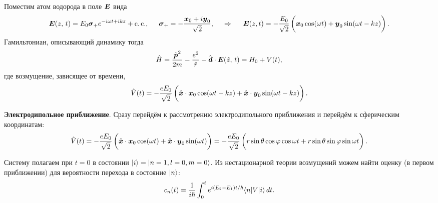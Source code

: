 Поместим атом водорода в поле $\mbox{\boldmath $E$}$ вида
\begin{equation*}
    \vc{E} (z,\, t) = E_0 \vc{\sigma}_+ e^{-i \omega t + i k z} + \cc, 
    \hspace{5 mm} 
    \vc{\sigma}_+ = - \frac{\vc{x}_0 + i \vc{y}_0}{\sqrt{2}},
    \hspace{0.5cm} \Rightarrow \hspace{0.5cm}   
    \vc{E} (z, t) = - \frac{{E}_0}{\sqrt{2}} \left(
        \vp
        \vc{x}_0 \cos(\omega t) + \vc{y}_0 \sin(\omega t - k z)
    \right).
\end{equation*}
Гамильтониан, описывающий динамику тогда
\begin{equation*}
    \hat{H} = \frac{\hat{\mbox{\boldmath $p$}}^2}{2 m} - \frac{e^2}{\hat{r}} - \hat{\mbox{\boldmath $d$}} \cdot \mbox{\boldmath $E$} (\hat{z},\, t) = H_0 + V(t),
\end{equation*}
где возмущение, зависящее от времени,
\begin{equation*}
    \hat{V}(t) = - \frac{e E_0}{\sqrt{2}} \left( \vp
        \hat{\vc{x}} \cdot\vc{x}_0 \cos(\omega t - kz) +\hat{\vc{x}} \cdot \vc{y}_0 \sin(\omega t - k z)
    \right).
\end{equation*}

\textbf{Электродипольное приближение}. Сразу перейдём к рассмотрению электродипольного приближения и перейдём к сферическим координатам:
\begin{equation*}
    \hat{V}(t) = - \frac{e E_0}{\sqrt{2}} \left( \vp
        \hat{\vc{x}} \cdot\vc{x}_0 \cos(\omega t) +\hat{\vc{x}} \cdot \vc{y}_0 \sin(\omega t)
    \right)
    =
    - \frac{e E_0}{\sqrt{2}} \left( \vp
        r \sin \theta \cos \varphi \cos \omega t +
        r \sin \theta \sin \varphi \sin \omega t
    \right)
    .
\end{equation*}

Систему полагаем при $t=0$ в состоянии $\left| i \right\rangle = \left| n=1,l=0,m=0 \right\rangle$. Из нестационарной теории возмущений можем найти оценку (в первом приближении) для вероятности перехода в состояние $\left| n \right\rangle$:
\begin{equation*}
    c_n (t) = \frac{1}{i \hbar} \int_0^t e^{i (E_2-E_1)t/\hbar} \bk{n}[V]{i} \d t.
\end{equation*}



